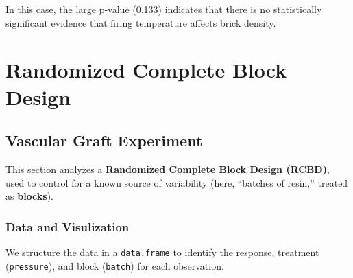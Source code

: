 \documentclass[
  letterpaper,
]{scrbook}
\begin{document}
In this case, the large p-value (0.133) indicates that there is no
statistically significant evidence that firing temperature affects brick
density.

\section{Randomized Complete Block
Design}\label{randomized-complete-block-design}

\subsection{Vascular Graft Experiment}\label{vascular-graft-experiment}

This section analyzes a \textbf{Randomized Complete Block Design
(RCBD)}, used to control for a known source of variability (here,
``batches of resin,'' treated as \textbf{blocks}).

\subsubsection{Data and Visulization}\label{data-and-visulization}

We structure the data in a \texttt{data.frame} to identify the response,
treatment (\texttt{pressure}), and block (\texttt{batch}) for each
observation.
\end{document}
